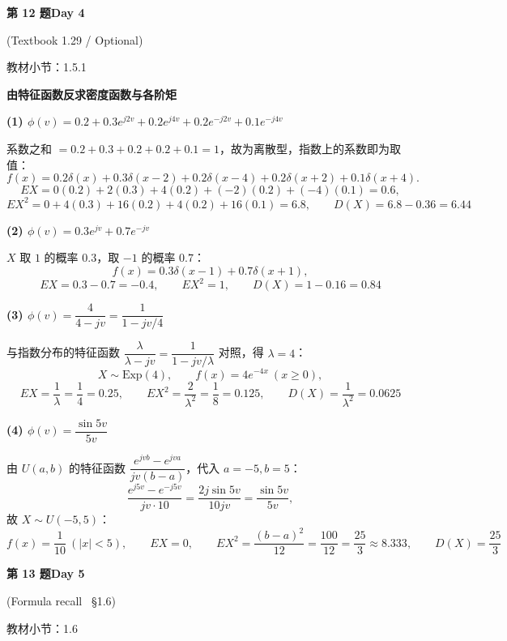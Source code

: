 \documentclass[10.5pt,fontset=fandol]{ctexart}
\newcommand{\key}[1]{\par\vspace{4pt}\noindent\textbf{\color{navy}#1}\par\vspace{2pt}}
\newcommand{\qtitle}[2]{\par\addvspace{1.2em}\Needspace{8\baselineskip}\begin{tcolorbox}[colback=navy,colframe=navy,arc=1.5pt,boxrule=0pt]\color{white}\large\bfseries #1\hfill\small #2\end{tcolorbox}}
\begin{document}
\qtitle{第 12 题}{Day 4}
{\small\color{accentred}(Textbook 1.29 / Optional)}\par\smallskip
{\small\color{muted}教材小节：1.5.1}\par\medskip
\noindent\textbf{由特征函数反求密度函数与各阶矩}\par\smallskip\begin{tcolorbox}[breakable,colback=qbg,colframe=qbg,boxrule=0pt]\key{(1) $\phi(v)=0.2+0.3e^{j2v}+0.2e^{j4v}+0.2e^{-j2v}+0.1e^{-j4v}$}
系数之和 $=0.2+0.3+0.2+0.2+0.1=1$，故为离散型，指数上的系数即为取值：
\[
f(x)=0.2\delta(x)+0.3\delta(x-2)+0.2\delta(x-4)+0.2\delta(x+2)+0.1\delta(x+4).
\]
\[
E X=0(0.2)+2(0.3)+4(0.2)+(-2)(0.2)+(-4)(0.1)=0.6,
\]
\[
E X^2=0+4(0.3)+16(0.2)+4(0.2)+16(0.1)=6.8,
\qquad
D(X)=6.8-0.36=\boxed{6.44}
\]

\key{(2) $\phi(v)=0.3e^{jv}+0.7e^{-jv}$}
$X$ 取 $1$ 的概率 $0.3$，取 $-1$ 的概率 $0.7$：
\[
f(x)=0.3\delta(x-1)+0.7\delta(x+1),
\]
\[
EX=0.3-0.7=-0.4,\qquad EX^2=1,\qquad D(X)=1-0.16=\boxed{0.84}
\]

\key{(3) $\phi(v)=\dfrac{4}{4-jv}=\dfrac{1}{1-jv/4}$}
与指数分布的特征函数 $\dfrac{\lambda}{\lambda-jv}=\dfrac{1}{1-jv/\lambda}$ 对照，得 $\lambda=4$：
\[
X\sim\mathrm{Exp}(4),\qquad f(x)=4e^{-4x}\ (x\ge0),
\]
\[
EX=\frac1\lambda=\frac14=0.25,\qquad
EX^2=\frac{2}{\lambda^2}=\frac{1}{8}=0.125,\qquad
D(X)=\frac{1}{\lambda^2}=\boxed{0.0625}
\]

\key{(4) $\phi(v)=\dfrac{\sin 5v}{5v}$}
由 $U(a,b)$ 的特征函数 $\dfrac{e^{jvb}-e^{jva}}{jv(b-a)}$，代入 $a=-5,b=5$：
\[
\frac{e^{j5v}-e^{-j5v}}{jv\cdot10}=\frac{2j\sin5v}{10jv}=\frac{\sin5v}{5v},
\]
故 $X\sim U(-5,5)$：
\[
f(x)=\frac{1}{10}\ (|x|<5),\qquad
EX=0,\qquad
EX^2=\frac{(b-a)^2}{12}=\frac{100}{12}=\boxed{\frac{25}{3}\approx8.333},\qquad
D(X)=\frac{25}{3}
\]
\end{tcolorbox}
\qtitle{第 13 题}{Day 5}
{\small\color{accentred}(Formula recall \textperiodcentered\ \S1.6)}\par\smallskip
{\small\color{muted}教材小节：1.6}\par\medskip
\end{document}
